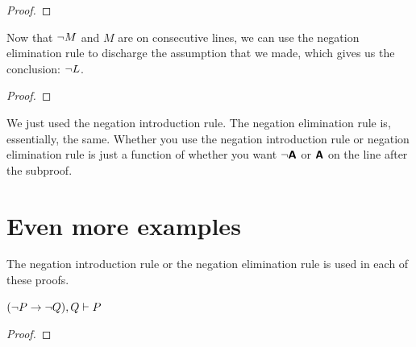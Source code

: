 {{{{{{{{{\begin{proof}
	 \pr{}	
	 \pr{}
	\open
		\as{}
\end{proof}
Now that ${\neg} M$ and $M$ are on consecutive lines, we can use the negation elimination rule to discharge the assumption that we made, which gives us the conclusion: ${\neg} L$.

\begin{proof}
	 \pr{}	
	 \pr{}
	\open
		\as{}
	\close
\end{proof}

We just used the negation introduction rule. The negation elimination rule is, essentially, the same. Whether you use the negation introduction rule or negation elimination rule is just a function of whether you want ${\neg} \bm{\mathsf{A}}$ or $\bm{\mathsf{A}}$ on the line after the subproof.



\section{Even more examples}

The negation introduction rule or the negation elimination rule is used in each of these proofs.

\begin{earg}

\noindent\begin{minipage}{0.99\textwidth}
\item $({\neg} P \rightarrow {\neg} Q), Q \vdash P$
\begin{proof}
	 \pr{}	
	 \pr{}
	\open
		\as{}
	\close
\end{proof}
\medskip
\end{minipage}

\end{earg}}}}}}}}}}

